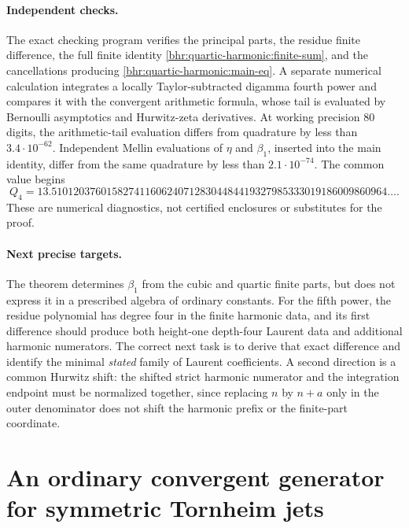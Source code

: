 \documentclass[11pt]{article}
\numberwithin{equation}{section}
\theoremstyle{plain}
\theoremstyle{definition}
\theoremstyle{remark}
\begin{document}
\paragraph{Independent checks.}
The exact checking program verifies the principal parts, the residue
finite difference, the full finite identity
\eqref{bhr:quartic-harmonic:finite-sum}, and the cancellations producing
\eqref{bhr:quartic-harmonic:main-eq}. A separate numerical calculation
integrates a locally Taylor-subtracted digamma fourth power and compares
it with the convergent arithmetic formula, whose tail is evaluated by
Bernoulli asymptotics and Hurwitz-zeta derivatives. At working precision
80 digits, the arithmetic-tail evaluation differs from quadrature by
less than $3.4\cdot10^{-62}$. Independent Mellin evaluations of $\eta$
and $\beta_1$, inserted into the main identity, differ from the same
quadrature by less than $2.1\cdot10^{-74}$. The common value begins
\[
 Q_4=13.5101203760158274116062407128304484419327985333019186009860964\ldots.
\]
These are numerical diagnostics, not certified enclosures or substitutes
for the proof.

\paragraph{Next precise targets.}
The theorem determines $\beta_1$ from the cubic and quartic finite parts,
but does not express it in a prescribed algebra of ordinary constants.
For the fifth power, the residue polynomial has degree four in the
finite harmonic data, and its first difference should produce both
height-one depth-four Laurent data and additional harmonic numerators.
The correct next task is to derive that exact difference and identify the
minimal \emph{stated} family of Laurent coefficients. A second direction
is a common Hurwitz shift: the shifted strict harmonic numerator and the
integration endpoint must be normalized together, since replacing
$n$ by $n+a$ only in the outer denominator does not shift the harmonic
prefix or the finite-part coordinate.



\section{An ordinary convergent generator for symmetric Tornheim jets}
\label{bhr:fcy:section}
\end{document}
